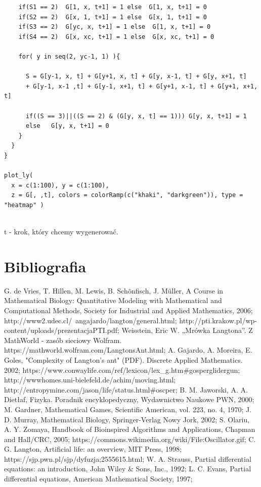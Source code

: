 \documentclass[a4paper,12pt]{article}
\begin{document}
\begin{verbatim}
    if(S1 == 2)  G[1, x, t+1] = 1 else  G[1, x, t+1] = 0
    if(S2 == 2)  G[x, 1, t+1] = 1 else  G[x, 1, t+1] = 0
    if(S3 == 2)  G[yc, x, t+1] = 1 else  G[1, x, t+1] = 0
    if(S4 == 2)  G[x, xc, t+1] = 1 else  G[x, xc, t+1] = 0
    
    for( y in seq(2, yc-1, 1) ){
      
      S = G[y-1, x, t] + G[y+1, x, t] + G[y, x-1, t] + G[y, x+1, t] 
      + G[y-1, x-1 ,t] + G[y-1, x+1, t] + G[y+1, x-1, t] + G[y+1, x+1, t] 

      if((S == 3)||((S == 2) & (G[y, x, t] == 1))) G[y, x, t+1] = 1 
      else   G[y, x, t+1] = 0
    }
  }
}

plot_ly(
  x = c(1:100), y = c(1:100),
  z = G[, ,t], colors = colorRamp(c("khaki", "darkgreen")), type = "heatmap" )
 
\end{verbatim}
t - krok, który chcemy wygenerować.

\section{Bibliografia}
\begin{thebibliography}{99}
 G. de Vries, T. Hillen, M. Lewis, B. Schõnfisch, J. M\"uller, A Course in Mathematical Biology: Quantitative Modeling with Mathematical and Computational Methods, Society for Industrial and Applied Mathematics, 2006;
 http://www2.udec.cl/~angajardo/langton/general.html;
 http://pti.krakow.pl/wp-content/uploads/prezentacjaPTI.pdf;
 Weisstein, Eric W. „Mrówka Langtona”. Z MathWorld - zasób sieciowy Wolfram. https://mathworld.wolfram.com/LangtonsAnt.html;
 A. Gajardo, A. Moreira, E. Goles, "Complexity of Langton's ant" (PDF). Discrete Applied Mathematics. 2002;
 https://www.conwaylife.com/ref/lexicon/lex\_g.htm#gosperglidergun;
 http://wwwhomes.uni-bielefeld.de/achim/moving.html;
 http://entropymine.com/jason/life/status.html#oscper;
 B. M. Jaworski, A. A. Dietłaf, Fizyka. Poradnik encyklopedyczny, Wydawnictwo Naukowe PWN, 2000;
 M. Gardner, Mathematical Games, Scientific American, vol. 223, no. 4, 1970;
 J. D. Murray, Mathematical Biology, Springer-Verlag Nowy Jork, 2002;
 S. Olariu, A. Y. Zomaya, Handbook of Bioinspired Algorithms and Applications, Chapman and Hall/CRC, 2005;
 https://commons.wikimedia.org/wiki/File:Oscillator.gif;
  C. G. Langton, Artificial life: an overview, MIT Press, 1998;
 https://sjp.pwn.pl/sjp/dyfuzja;2555615.html;
 W. A. Strauss, Partial differential equations: an introduction, John Wiley & Sons, Inc., 1992;
 L. C. Evans, Partial differential equations, American Mathematical Society, 1997;
\end{thebibliography}
\end{document}
